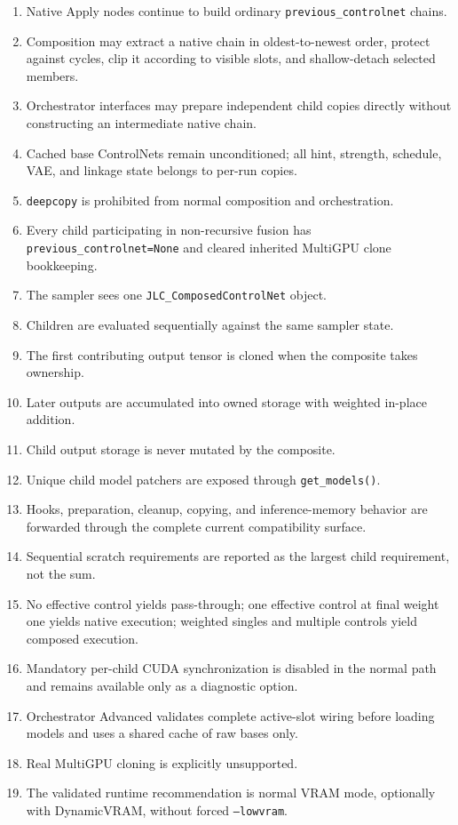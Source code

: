 \documentclass[11pt]{article}
\newcommand{\code}[1]{\texttt{#1}}
\begin{document}
\begin{enumerate}
  \item Native Apply nodes continue to build ordinary \code{previous\_controlnet} chains.
  \item Composition may extract a native chain in oldest-to-newest order, protect against cycles, clip it according to visible slots, and shallow-detach selected members.
  \item Orchestrator interfaces may prepare independent child copies directly without constructing an intermediate native chain.
  \item Cached base ControlNets remain unconditioned; all hint, strength, schedule, VAE, and linkage state belongs to per-run copies.
  \item \code{deepcopy} is prohibited from normal composition and orchestration.
  \item Every child participating in non-recursive fusion has \code{previous\_controlnet=None} and cleared inherited MultiGPU clone bookkeeping.
  \item The sampler sees one \code{JLC\_ComposedControlNet} object.
  \item Children are evaluated sequentially against the same sampler state.
  \item The first contributing output tensor is cloned when the composite takes ownership.
  \item Later outputs are accumulated into owned storage with weighted in-place addition.
  \item Child output storage is never mutated by the composite.
  \item Unique child model patchers are exposed through \code{get\_models()}.
  \item Hooks, preparation, cleanup, copying, and inference-memory behavior are forwarded through the complete current compatibility surface.
  \item Sequential scratch requirements are reported as the largest child requirement, not the sum.
  \item No effective control yields pass-through; one effective control at final weight one yields native execution; weighted singles and multiple controls yield composed execution.
  \item Mandatory per-child CUDA synchronization is disabled in the normal path and remains available only as a diagnostic option.
  \item Orchestrator Advanced validates complete active-slot wiring before loading models and uses a shared cache of raw bases only.
  \item Real MultiGPU cloning is explicitly unsupported.
  \item The validated runtime recommendation is normal VRAM mode, optionally with DynamicVRAM, without forced \code{--lowvram}.
\end{enumerate}
\end{document}
